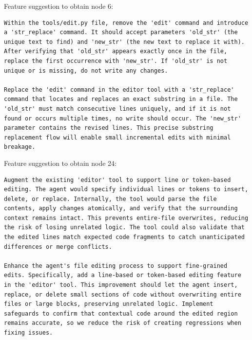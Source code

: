 \documentclass{article} %
\begin{document}
Feature suggestion to obtain node 6:

\begin{lstlisting}
Within the tools/edit.py file, remove the 'edit' command and introduce a 'str_replace' command. It should accept parameters 'old_str' (the unique text to find) and 'new_str' (the new text to replace it with). After verifying that 'old_str' appears exactly once in the file, replace the first occurrence with 'new_str'. If 'old_str' is not unique or is missing, do not write any changes.

Replace the 'edit' command in the editor tool with a 'str_replace' command that locates and replaces an exact substring in a file. The 'old_str' must match consecutive lines uniquely, and if it is not found or occurs multiple times, no write should occur. The 'new_str' parameter contains the revised lines. This precise substring replacement flow will enable small incremental edits with minimal breakage.
\end{lstlisting}


Feature suggestion to obtain node 24:

\begin{lstlisting}
Augment the existing 'editor' tool to support line or token-based editing. The agent would specify individual lines or tokens to insert, delete, or replace. Internally, the tool would parse the file contents, apply changes atomically, and verify that the surrounding context remains intact. This prevents entire-file overwrites, reducing the risk of losing unrelated logic. The tool could also validate that the edited lines match expected code fragments to catch unanticipated differences or merge conflicts.

Enhance the agent's file editing process to support fine-grained edits. Specifically, add a line-based or token-based editing feature in the 'editor' tool. This improvement should let the agent insert, replace, or delete small sections of code without overwriting entire files or large blocks, preserving unrelated logic. Implement safeguards to confirm that contextual code around the edited region remains accurate, so we reduce the risk of creating regressions when fixing issues.
\end{lstlisting}
\end{document}
